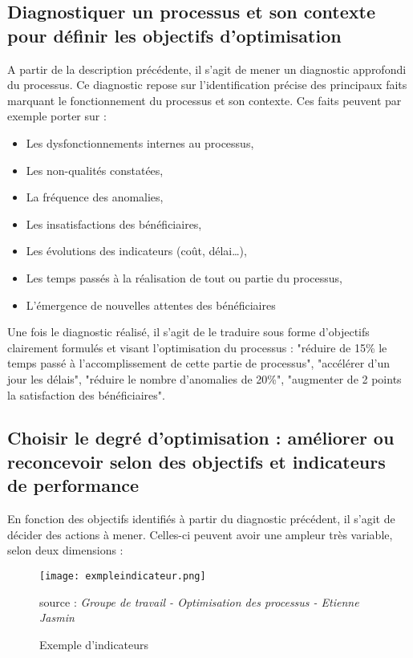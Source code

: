 	\subsection{Diagnostiquer un processus et son contexte pour définir les objectifs d’optimisation}

A partir de la description précédente, il s'agit de mener un diagnostic approfondi du processus. Ce diagnostic repose sur l'identification précise des principaux faits marquant le fonctionnement du processus et son contexte. Ces faits peuvent par exemple porter sur : 

\begin{itemize}[label=\textbullet, font=\LARGE \color{blue}]
	\item Les dysfonctionnements internes au processus, 
	
	\item Les non-qualités constatées, 
	
	\item La fréquence des anomalies, 
	
	\item Les insatisfactions des bénéficiaires, 
	
	\item Les évolutions des indicateurs (coût, délai…), 
	
	\item Les temps passés à la réalisation de tout ou partie du processus,  
	
	\item L'émergence de nouvelles attentes des bénéficiaires
\end{itemize}

Une fois le diagnostic réalisé, il s'agit de le traduire sous forme d'objectifs clairement formulés et visant l'optimisation du processus : "réduire de 15\% le temps passé à l'accomplissement de cette partie de processus", "accélérer d'un jour les délais", "réduire le nombre d'anomalies de 20\%", "augmenter de 2 points la satisfaction des bénéficiaires".

\subsection{Choisir le degré d’optimisation : améliorer ou reconcevoir selon des objectifs et indicateurs de performance}

En fonction des objectifs identifiés à partir du diagnostic précédent, il s’agit de décider des actions à mener. Celles-ci peuvent avoir une ampleur très variable, selon deux dimensions : 
\begin{figure}[H]
	\centering
	\texttt{[image: exmpleindicateur.png]}
	\caption{Exemple d'indicateurs}{ \begin{center} source : \textit{Groupe de travail - Optimisation des processus - Etienne Jasmin} \end{center}}
	\label{fig:exemple d'indicateur}
\end{figure}

